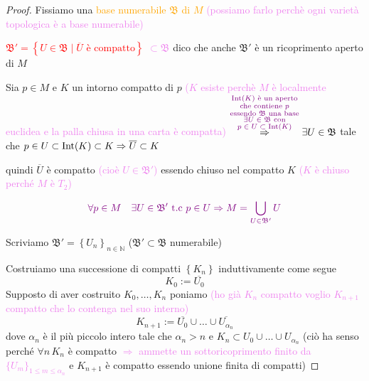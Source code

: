         \begin{proof}
        \mbox{}

        Fissiamo una \textcolor{orange}{base numerabile $\mathfrak{B}$ di $M$} \textcolor{violet}{(possiamo farlo perchè ogni varietà topologica è a base numerabile)}
        
        \textcolor{red}{$\mathfrak{B}'= \left\{U \in \mathfrak{B} \mid \overline{U} \text{ è compatto} \right\}$} \textcolor{violet}{$\subset \mathfrak{B}$} dico che anche $\mathfrak{B}'$ è un ricoprimento aperto di $M$
        
        Sia $p \in M$ e $K$ un intorno compatto di $p$
        \textcolor{violet}{($K$ esiste perchè $M$ è localmente euclidea e la palla chiusa in una carta è compatta)} 
        $\overset{\textcolor{violet}{\substack{\text{$\operatorname{Int}(K)$ è un aperto} \\ \text{che contiene $p$} \\ 
        \text{essendo $\mathfrak{B}$ una base} \\  \text{$\exists U \in\mathfrak{B}$ con} \\ 
        \text{$p\in U\subset \mathrm{Int}(K)$} } }}{\Rightarrow} \exists U \in \mathfrak{B}$ tale che $p \in U \subset \operatorname{Int} (K) \subset K \Rightarrow \overline{U} \subset K$ 
        
        quindi $\overline{U}$ è compatto \textcolor{violet}{(cioè $U\in\mathfrak{B}'$)} essendo chiuso nel compatto $K$ \textcolor{violet}{($K$ è chiuso perché $M$ è $T_2$)}

        \begin{equation}
        \label{eq:dimostrazione_esaustione_in_compatti}
        \color{violet} \forall p \in M \quad \exists U \in \mathfrak{B}' \text{ t.c } p \in U \Rightarrow M=\bigcup_{U \in \mathfrak{B}'} U
        \end{equation}

        Scriviamo $\mathfrak{B}' = \left\{U_n\right\}_{n \in \mathbb{N}}$ \textcolor{blu}{($\mathfrak{B}' \subset \mathfrak{B}$ numerabile)}
        
        Costruiamo una successione di compatti $\left\{K_n\right\}$ induttivamente come segue 
        \[ K_0 := \overline{U_0} \] 
        Supposto di aver costruito $K_0, \dots, K_n$ poniamo  
        \textcolor{violet}{(ho già $K_n$ compatto voglio $K_{n+1}$ compatto che lo contenga nel suo interno)}
        \[ K_{n+1} := \overline{U_0} \cup \dots \cup \overline{U_{\alpha_n}} \] 
        dove $\alpha_n$ è il più piccolo intero tale che $\alpha_n >n$ e $K_n \subset U_0 \cup \dots \cup U_{\alpha_n}$
        \textcolor{blu}{(ciò ha senso perché $\forall n \, K_n$ è compatto \textcolor{violet}{$\Rightarrow$ ammette un sottoricoprimento finito da
        $\{U_m\}_{1 \leq m \leq \alpha_n}$} e $K_{n+1}$ è compatto essendo unione finita di compatti)} 
        

\end{proof}
